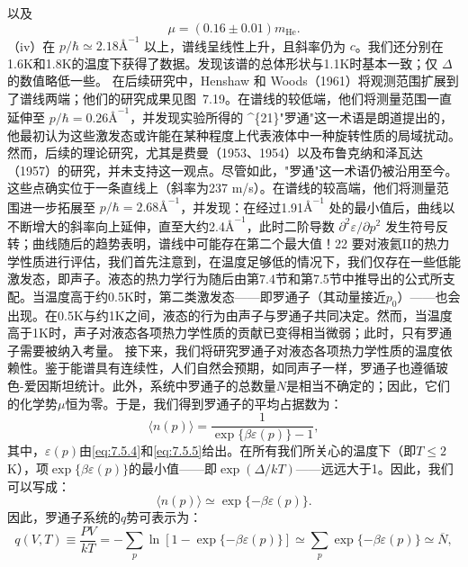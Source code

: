 以及
\begin{equation}\tag{7.5.23}\label{eq:7.5.23}
\mu = ( 0 . 16 \pm 0 . 01 ) m _ { \mathrm { H e } } .
\end{equation}
（iv）在 \(p/\hbar \simeq 2.18\text{\AA}^{-1}\) 以上，谱线呈线性上升，且斜率仍为 \(c\)。我们还分别在1.6K和1.8K的温度下获得了数据。发现该谱的总体形状与1.1K时基本一致；仅 \(\Delta\) 的数值略低一些。
在后续研究中，Henshaw 和 Woods（1961）将观测范围扩展到了谱线两端；他们的研究成果见图~7.19。在谱线的较低端，他们将测量范围一直延伸至 \(p/\hbar = 0.26\text{\AA}^{-1}\)，并发现实验所得的
\^{}\{21\}"罗通"这一术语是朗道提出的，他最初认为这些激发态或许能在某种程度上代表液体中一种旋转性质的局域扰动。然而，后续的理论研究，尤其是费曼（1953、1954）以及布鲁克纳和泽瓦达（1957）的研究，并未支持这一观点。尽管如此，"罗通"这一术语仍被沿用至今。
这些点确实位于一条直线上（斜率为237 m/s）。在谱线的较高端，他们将测量范围进一步拓展至 \(p/\hbar=2.68\text{\AA}^{-1}\)，并发现：在经过1.91\(\text{\AA}^{-1}\) 处的最小值后，曲线以不断增大的斜率向上延伸，直至大约2.4\(\text{\AA}^{-1}\)，此时二阶导数 \(\partial^2\varepsilon/\partial p^2\) 发生符号反转；曲线随后的趋势表明，谱线中可能存在第二个最大值！22
要对液氦II的热力学性质进行评估，我们首先注意到，在温度足够低的情况下，我们仅存在一些低能激发态，即声子。液态的热力学行为随后由第7.4节和第7.5节中推导出的公式所支配。当温度高于约0.5K时，第二类激发态——即罗通子（其动量接近\(p_0\)）——也会出现。在0.5K与约1K之间，液态的行为由声子与罗通子共同决定。然而，当温度高于1K时，声子对液态各项热力学性质的贡献已变得相当微弱；此时，只有罗通子需要被纳入考量。
接下来，我们将研究罗通子对液态各项热力学性质的温度依赖性。鉴于能谱具有连续性，人们自然会预期，如同声子一样，罗通子也遵循玻色-爱因斯坦统计。此外，系统中罗通子的总数量\(N\)是相当不确定的；因此，它们的化学势\(\mu\)恒为零。于是，我们得到罗通子的平均占据数为：
\begin{equation}\tag{7.5.24}\label{eq:7.5.24}
\langle n ( p ) \rangle = \frac { 1 } { \exp \{ \beta \varepsilon ( p ) \} - 1 } ,
\end{equation}
其中，\(\varepsilon(p)\)由\autoref{eq:7.5.4}和\autoref{eq:7.5.5}给出。在所有我们所关心的温度下（即\(T \leq 2\)K），项\(\exp\{\beta\varepsilon(p)\}\)的最小值——即\(\exp(\Delta/kT)\)——远远大于1。因此，我们可以写成：
\begin{equation}\tag{7.5.25}\label{eq:7.5.25}
\langle n ( p ) \rangle \simeq \exp \{ - \beta \varepsilon ( p ) \} .
\end{equation}
因此，罗通子系统的\(q\)势可表示为：
\begin{equation}\tag{7.5.26}\label{eq:7.5.26}
q ( V , T ) \equiv \frac { P V } { k T } = - \sum _ { p } \ln [ 1 - \exp \{ - \beta \varepsilon ( p ) \} ] \simeq \sum _ { p } \exp \{ - \beta \varepsilon ( p ) \} \simeq \overline { { { N } } } ,
\end{equation}
